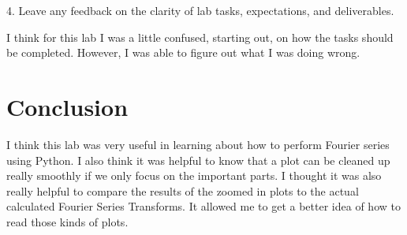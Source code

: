 \documentclass[12pt]{report}
\begin{document}
4. Leave any feedback on the clarity of lab tasks, expectations, and
deliverables.

I think for this lab I was a little confused, starting out, on how the
tasks should be completed. However, I was able to figure out what I was
doing wrong.

\section{Conclusion}
I think this lab was very useful in learning about how to perform
Fourier series using Python. I also think it was helpful to know that a
plot can be cleaned up really smoothly if we only focus on the important
parts. I thought it was also really helpful to compare the results of the
zoomed in plots to the actual calculated Fourier Series Transforms. It
allowed me to get a better idea of how to read those kinds of plots.
\end{document}
